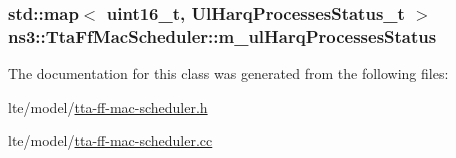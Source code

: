 \subsubsection[{\texorpdfstring{m\+\_\+ul\+Harq\+Processes\+Status}{m_ulHarqProcessesStatus}}]{\setlength{\rightskip}{0pt plus 5cm}std\+::map$<$ uint16\+\_\+t, {\bf Ul\+Harq\+Processes\+Status\+\_\+t} $>$ ns3\+::\+Tta\+Ff\+Mac\+Scheduler\+::m\+\_\+ul\+Harq\+Processes\+Status\hspace{0.3cm}{\ttfamily [private]}}\hypertarget{classns3_1_1TtaFfMacScheduler_a2c0bc82abe6c71b7e4d85b4caca2aaa6}{}\label{classns3_1_1TtaFfMacScheduler_a2c0bc82abe6c71b7e4d85b4caca2aaa6}


The documentation for this class was generated from the following files\+:\begin{DoxyCompactItemize}
\item 
lte/model/\hyperlink{lte_2model_2tta-ff-mac-scheduler_8h}{tta-\/ff-\/mac-\/scheduler.\+h}\item 
lte/model/\hyperlink{lte_2model_2tta-ff-mac-scheduler_8cc}{tta-\/ff-\/mac-\/scheduler.\+cc}\end{DoxyCompactItemize}
